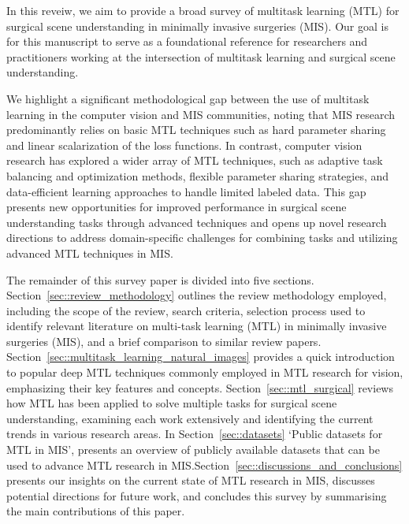 \documentclass[times,twocolumn,final]{elsarticle}
\newcommand{\secref}[1]{Section~\ref{#1}}
\begin{document}
In this reveiw, we aim to provide a broad
survey of multitask learning (MTL) for surgical scene understanding in minimally invasive surgeries (MIS). Our goal is for this manuscript to serve as a foundational reference for researchers and practitioners working at the intersection of multitask
learning and surgical scene understanding. 



We highlight a significant methodological gap between the use of multitask learning in the computer vision and MIS communities, noting that MIS research predominantly relies on basic MTL techniques such as hard parameter sharing and linear scalarization of the loss functions.
In contrast, computer vision research has explored a wider array of MTL techniques, such as adaptive task balancing and optimization methods, flexible parameter sharing strategies, and data-efficient learning approaches to handle limited labeled data. This gap presents new opportunities for improved performance in surgical scene understanding tasks through advanced techniques and opens up novel research directions to address domain-specific challenges for combining tasks and utilizing advanced MTL techniques in MIS.



The remainder of this survey paper is divided into five sections. 
\secref{sec::review_methodology} outlines the review methodology employed, including the scope of the review, search criteria, selection process used to identify relevant literature on multi-task learning (MTL) in minimally invasive surgeries (MIS), and a brief comparison to similar review papers. 
\secref{sec::multitask_learning_natural_images} provides a quick introduction to popular deep MTL techniques commonly employed in MTL research for vision, emphasizing their key features and concepts. \secref{sec::mtl_surgical} reviews how MTL has been applied to solve multiple tasks for surgical scene understanding, examining each work extensively and identifying the current trends in various research areas. In \secref{sec::datasets} `Public datasets for MTL in MIS', presents an overview of publicly available datasets that can be used to advance MTL research in MIS.\secref{sec::discussions_and_conclusions} presents our insights on the current state of MTL research in MIS, discusses potential directions for future work, and concludes this survey by summarising the main contributions of this paper.
\end{document}
